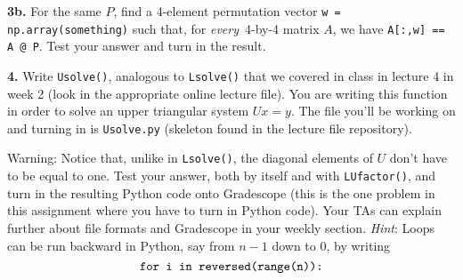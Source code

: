 \documentclass[11pt]{article}
\begin{document}
\par\medskip
\textbf {3b.} For the same $P$, 
find a 4-element permutation vector {\tt w = np.array(something)}
such that, for {\em every}\, 4-by-4 matrix $A$, 
we have {\tt A[:,w] == A @ P}. 
Test your answer and turn in the result.

\par\bigskip
\textbf {4.}
Write {\tt Usolve()}, analogous to {\tt Lsolve()} that we covered in class in lecture 4 in week 2 (look in the appropriate online lecture file). You are writing this function in order to solve an upper triangular system $Ux=y$. The file you'll be working on and turning in is {\tt Usolve.py} (skeleton found in the lecture file repository). 

Warning: Notice that, unlike in {\tt Lsolve()}, 
the diagonal elements of $U$ don't have to be equal to one.
Test your answer, both by itself and with {\tt LUfactor()},
and turn in the resulting Python code onto Gradescope (this is the one problem in this assignment where you have to turn in Python code). Your TAs can explain further about file formats and Gradescope in your weekly section.
\textit{Hint}: Loops can be run backward in Python, 
say from $n-1$ down to $0$, by writing
$$\mbox{\tt for i in reversed(range(n)):}$$
\end{document}
